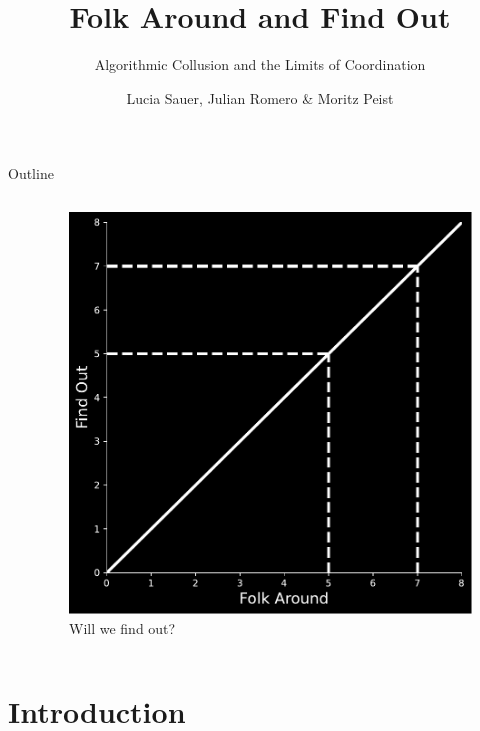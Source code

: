 \documentclass[10pt, aspectratio=169]{beamer}
\title{Folk Around and Find Out}
\subtitle{Algorithmic Collusion and the Limits of Coordination}
\date{}
\author{Lucia Sauer, Julian Romero \& Moritz Peist }
\institute{Barcelona School of Economics}
\begin{document}
\maketitle

\begin{frame}{Outline}
    \begin{columns}[c]
        \begin{column}{0.45\textwidth}
            \tableofcontents
        \end{column}
        \begin{column}{0.45\textwidth}
            \begin{figure}
                \centering
                \includegraphics[width=1\linewidth]{latex/slides_pricing_collusion/imgs/folk_around_find_out_static.pdf}
                \caption{Will we find out?}
                \label{fig:fafo}
            \end{figure}
        \end{column}
    \end{columns}
\end{frame}


\section{Introduction}
\end{document}
